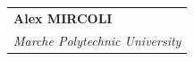 \documentclass[
	openany, %
	parskip=full, %
	12pt, %
	a4paper, %
]{conferencebooklet} %
\begin{document}
\begin{table}[h!]
{\begin{tabular}{p{75mm}}
            \textbf{Alex MIRCOLI} \\ 
            \textit{Marche Polytechnic University} \vspace{4mm} 
        \end{tabular}
    }
\end{table}
\end{document}
